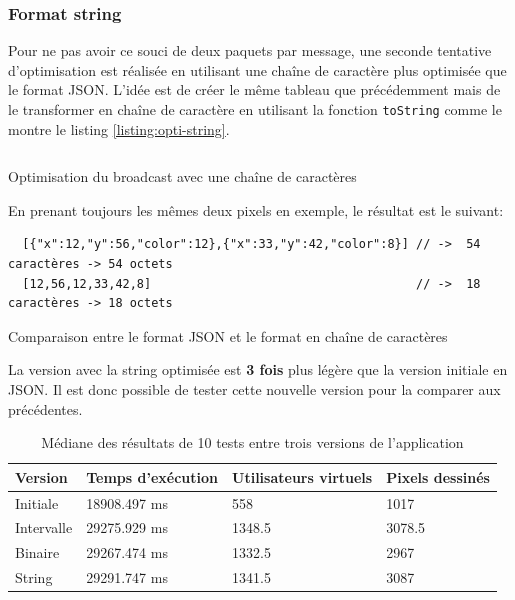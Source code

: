 \subsubsection{Format string}

Pour ne pas avoir ce souci de deux paquets par message, une seconde tentative d'optimisation est réalisée en utilisant une chaîne de caractère plus optimisée que le format JSON. L'idée est de créer le même tableau que précédemment mais de le transformer en chaîne de caractère en utilisant la fonction \texttt{toString} comme le montre le listing \ref{listing:opti-string}.

\begin{listing}[H]
  \inputminted[highlightlines={5,6}, linenos]{ts}{assets/figures/opti-string.ts}
  \caption{Optimisation du broadcast avec une chaîne de caractères}
  \label{listing:opti-string}
\end{listing}

En prenant toujours les mêmes deux pixels en exemple, le résultat est le suivant:

\begin{listing}[H]
  \begin{verbatim}
  [{"x":12,"y":56,"color":12},{"x":33,"y":42,"color":8}] // ->  54 caractères -> 54 octets
  [12,56,12,33,42,8]                                     // ->  18 caractères -> 18 octets
\end{verbatim}
  \caption{Comparaison entre le format JSON et le format en chaîne de caractères}
  \label{listing:json-vs-string}
\end{listing}

La version avec la string optimisée est \textbf{3 fois} plus légère que la version initiale en JSON. Il est donc possible de tester cette nouvelle version pour la comparer aux précédentes.

\begin{table}[H]
  \centering
  \begin{tabular}{|l|l|l|l|}
    \hline
    \textbf{Version} & \textbf{Temps d'exécution} & \textbf{Utilisateurs virtuels} & \textbf{Pixels dessinés} \\ \hline
    Initiale         & 18908.497 ms               & 558                            & 1017                     \\ \hline
    Intervalle       & 29275.929 ms               & 1348.5                         & 3078.5                   \\ \hline
    Binaire          & 29267.474 ms               & 1332.5                         & 2967                     \\ \hline
    String           & 29291.747 ms               & 1341.5                         & 3087                     \\ \hline
  \end{tabular}
  \caption{Médiane des résultats de 10 tests entre trois versions de l'application}
  \label{table:third-opti-results}
\end{table}

